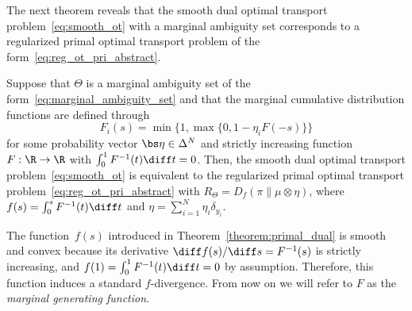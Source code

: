 \documentclass[11pt, a4paper, oneside, reqno]{article}
\begin{document}
	The next theorem reveals that the smooth dual optimal transport problem~\eqref{eq:smooth_ot} with a marginal ambiguity set corresponds to a regularized primal optimal transport problem of the form~\eqref{eq:reg_ot_pri_abstract}.
	
	\begin{theorem}
		\label{theorem:primal_dual}
		Suppose that $\Theta$ is a marginal ambiguity set of the form~\eqref{eq:marginal_ambiguity_set} and that the marginal cumulative distribution functions are defined through
		\begin{equation}
	        \label{eq:marginal_dists}
		    F_i(s) = \min\{1, \max\{0, 1-\eta_i F(-s)\}\}
		\end{equation}
		for some probability vector $\bs \eta \in \Delta^N$ and strictly increasing function $F: \R \to \R$ with $\int_0^1 F^{-1} (t) \diff t = 0$. Then, the smooth dual optimal transport problem~\eqref{eq:smooth_ot} is equivalent to the regularized primal optimal transport problem~\eqref{eq:reg_ot_pri_abstract} with $R_\Theta = D_f(\pi \| \mu \otimes \eta)$, where
	    $f(s) = \int_{0 }^{s} F^{-1}(t) \diff t$ and $\eta = \sum_{i=1}^N \eta_i \delta_{y_i}$.
	\end{theorem}
    
    The function~$f(s)$ introduced in Theorem~\ref{theorem:primal_dual} is smooth and convex because its derivative $ \diff f(s) / \diff s = F^{-1}(s)$ is strictly increasing, and 
    $f(1) = \int_0^1 F^{-1}(t) \diff t=0$ by assumption. Therefore, this function induces a standard $f$-divergence. From now on we will refer to $F$ as the {\em marginal generating function}.
    
\end{document}
